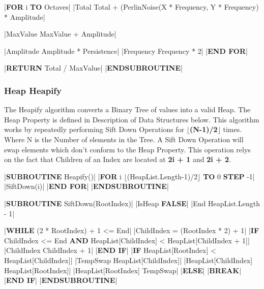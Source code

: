 \begin{flushleft}
\begin{pseudocode}
    |\textbf{FOR} i  \textbf{TO} Octaves|
        |Total \leftarrow Total + (PerlinNoise(X * Frequency, Y * Frequency) * Amplitude|

        |MaxValue \leftarrow MaxValue + Amplitude|

        |Amplitude \leftarrow Amplitude * Persistence|
        |Frequency \leftarrow Frequency * 2|
    |\textbf{END FOR}|

    |\textbf{RETURN} Total / MaxValue|
|\textbf{ENDSUBROUTINE}|            
                \end{pseudocode}

            \subsubsection{Heap Heapify}
                The Heapify algorithm converts a Binary Tree of values into a valid Heap. The Heap Property is defined in Description of Data
                Structures below. This algorithm works by repeatedly performing Sift Down Operations for \textbf{$\lfloor$(N-1)/2$\rfloor$} times.
                Where N is the Number of elements in the Tree. A Sift Down Operation will swap elements which don't conform to the Heap Property.
                This operation relys on the fact that Children of an Index are located at \textbf{2i + 1} and \textbf{2i + 2}.
                \vspace{0.2cm}

                \begin{pseudocode} 
|\textbf{SUBROUTINE} Heapify()|
    |\textbf{FOR} i \leftarrow $\lfloor$(HeapList.Length-1)/2$\rfloor$ \textbf{TO} 0 \textbf{STEP} -1|
        |SiftDown(i)|
    |\textbf{END FOR}|
|\textbf{ENDSUBROUTINE}| 

|\textbf{SUBROUTINE} SiftDown(RootIndex)|
    |IsHeap \leftarrow \textbf{FALSE}|
    |End \leftarrow HeapList.Length - 1|

    |\textbf{WHILE} (2 * RootIndex) + 1 <= End|
        |ChildIndex = (RootIndex * 2) + 1|
        |\textbf{IF} ChildIndex <= End \textbf{AND} HeapList[ChildIndex] < HeapList[ChildIndex + 1]|
            |ChildIndex \leftarrow ChildIndex + 1|
        |\textbf{END IF}|
        |\textbf{IF} HeapList[RootIndex] < HeapList[ChildIndex]|
            |TempSwap \leftarrow HeapList[ChildIndex]|
            |HeapList[ChildIndex] \leftarrow HeapList[RootIndex]|
            |HeapList[RootIndex] \leftarrow TempSwap|
        |\textbf{ELSE}|   
            |\textbf{BREAK}|
        |\textbf{END IF}|
|\textbf{ENDSUBROUTINE}| 
                \end{pseudocode}


\end{flushleft}
